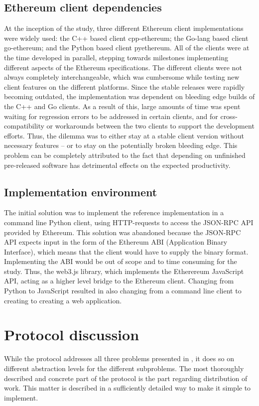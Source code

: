 \subsection{Ethereum client dependencies}
At the inception of the study, three different Ethereum client implementations were widely used: the C++ based client cpp-ethereum; the Go-lang based client go-ethereum; and the Python based client pyethereum. All of the clients were at the time developed in parallel, stepping towards milestones implementing different aspects of the Ethereum specifications. The different clients were not always completely interchangeable, which was cumbersome while testing new client features on the different platforms. Since the stable releases were rapidly becoming outdated, the implementation was dependent on bleeding edge builds of the C++ and Go clients. As a result of this, large amounts of time was spent waiting for regression errors to be addressed in certain clients, and for cross-compatibility or workarounds between the two clients to support the development efforts. Thus, the dilemma was to either stay at a stable client version without necessary features -- or to stay on the potentially broken bleeding edge. This problem can be completely attributed to the fact that depending on unfinished pre-released software has detrimental effects on the expected productivity.

\subsection{Implementation environment}
The initial solution was to implement the reference implementation in a command line Python client, using HTTP-requests to access the JSON-RPC API provided by Ethereum. This solution was abandoned because the JSON-RPC API expects input in the form of the Ethereum ABI (Application Binary Interface), which means that the client would have to supply the binary format. Implementing the ABI would be out of scope and to time consuming for the study. Thus, the web3.js library, which implements the Etherereum JavaScript API, acting as a higher level bridge to the Ethereum client. Changing from Python to JavaScript resulted in also changing from a command line client to creating to creating a web application.

\section{Protocol discussion}
While the protocol addresses all three problems presented in , it does so on different abstraction levels for the different subproblems. The most thoroughly described and concrete part of the protocol is the part regarding distribution of work. This matter is described in a sufficiently detailed way to make it simple to implement.

